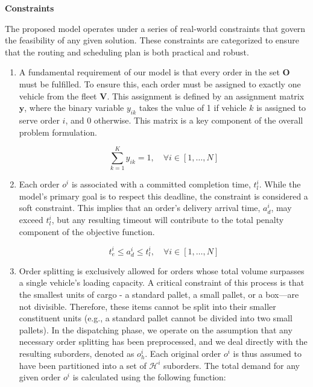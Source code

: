 \documentclass[]{interact}
\begin{document}
\textbf{Constraints}

The proposed model operates under a series of real-world constraints that govern the feasibility of any given solution. These constraints are categorized to ensure that the routing and scheduling plan is both practical and robust.

\begin{enumerate}
    \item A fundamental requirement of our model is that every order in the set $\textbf{O}$ must be fulfilled. To ensure this, each order must be assigned to exactly one vehicle from the fleet $\textbf{V}$. This assignment is defined by an assignment matrix $\textbf{y}$, where the binary variable $y_{ik}$ takes the value of 1 if vehicle $k$ is assigned to serve order $i$, and 0 otherwise. This matrix is a key component of the overall problem formulation.

\begin{equation}
    \sum_{k=1}^K y_{ik} = 1, \quad \forall i \in [1, \dots , N]
\end{equation}
    
    \item Each order $o^i$ is associated with a committed completion time, $t_l^i$. While the model's primary goal is to respect this deadline, the constraint is considered a soft constraint. This implies that an order's delivery arrival time, $a_d^i$, may exceed $t_l^i$, but any resulting timeout will contribute to the total penalty component of the objective function. 

\begin{equation}
    t_e ^i \leq a_d^i \leq t_l^i, \quad \forall i \in [1 , \dots,  N]
\end{equation}

    \item Order splitting is exclusively allowed for orders whose total volume surpasses a single vehicle's loading capacity. A critical constraint of this process is that the smallest units of cargo - a standard pallet, a small pallet, or a box—are not divisible. Therefore, these items cannot be split into their smaller constituent units (e.g., a standard pallet cannot be divided into two small pallets). In the dispatching phase, we operate on the assumption that any necessary order splitting has been preprocessed, and we deal directly with the resulting suborders, denoted as $o^i_h$. Each original order $o^i$ is thus assumed to have been partitioned into a set of $\mathcal{H} ^i$ suborders. The total demand for any given order $o^i$ is calculated using the following function:


\end{enumerate}
\end{document}
